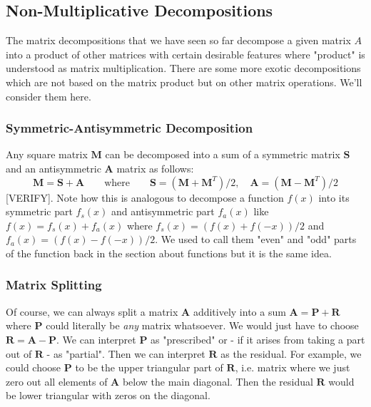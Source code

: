 \subsection{Non-Multiplicative Decompositions}
The matrix decompositions that we have seen so far decompose a given matrix $A$ into a product of other matrices with certain desirable features where "product" is understood as matrix multiplication. There are some more exotic decompositions which are not based on the matrix product but on other matrix operations. We'll consider them here.

\subsubsection{Symmetric-Antisymmetric Decomposition}
Any square matrix $\mathbf{M}$ can be decomposed into a sum of a symmetric matrix $\mathbf{S}$ and an antisymmetric $\mathbf{A}$ matrix as follows:
\begin{equation}
\mathbf{M} = \mathbf{S + A} \qquad \text{where}  \qquad
\mathbf{S} = (\mathbf{M} + \mathbf{M}^T) / 2,  \quad
\mathbf{A} = (\mathbf{M} - \mathbf{M}^T) / 2
\end{equation}
[VERIFY]. Note how this is analogous to decompose a function $f(x)$ into its symmetric part $f_s(x)$ and antisymmetric part $f_a(x)$ like $f(x) = f_s(x) + f_a(x)$ where $f_s(x) = (f(x) + f(-x)) / 2$ and $f_a(x) = (f(x) - f(-x)) / 2$. We used to call them "even" and "odd" parts of the function back in the section about functions but it is the same idea.


\subsubsection{Matrix Splitting}
Of course, we can always split a matrix $\mathbf{A}$ additively into a sum $\mathbf{A} = \mathbf{P + R}$ where $\mathbf{P}$ could literally be \emph{any} matrix whatsoever. We would just have to choose $\mathbf{R} = \mathbf{A - P}$. We can interpret $\mathbf{P}$ as "prescribed" or - if it arises from taking a part out of $\mathbf{R}$ - as "partial". Then we can interpret $\mathbf{R}$ as the residual. For example, we could choose $\mathbf{P}$ to be the upper triangular part of $\mathbf{R}$, i.e. matrix where we just zero out all elements of $\mathbf{A}$ below the main diagonal. Then the residual $\mathbf{R}$ would be lower triangular with zeros on the diagonal. 


